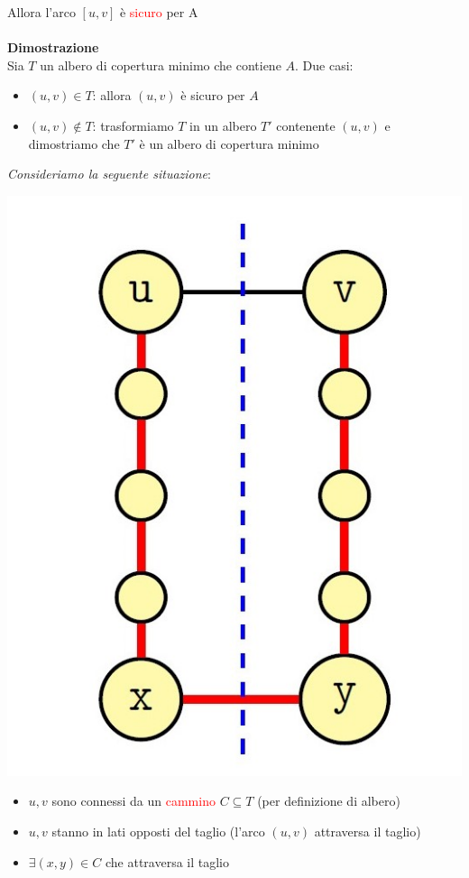 \documentclass[../cheatSheetAlgoritmi.tex]{subfiles}
\begin{document}
Allora l'arco $[u, v]$ è \textcolor{red}{sicuro} per A\\\\
\textbf{Dimostrazione}\\
Sia $T$ un albero di copertura minimo che contiene $A$. Due casi:
\begin{itemize}
	\item $(u, v) \in T$: allora $(u, v)$ è sicuro per $A$
	\item $(u, v) \notin T$: trasformiamo $T$ in un albero $T'$ contenente $(u, v)$ e dimostriamo che $T'$ è un albero di copertura minimo
\end{itemize}
\newpage
\begin{flushleft}
\emph{Consideriamo la seguente situazione}:
\end{flushleft}
\noindent\begin{minipage}{0.3\textwidth}
\includegraphics[width=\linewidth]{../img/Greedy_5.jpg}
\end{minipage}
\hfill
\begin{minipage}{0.6\textwidth}\raggedleft
\begin{itemize}
	\item $u, v$ sono connessi da un \textcolor{red}{cammino} $C \subseteq T$ (per definizione di albero)
	\item $u, v$ stanno in lati opposti del taglio (l'arco $(u, v)$ attraversa il taglio)
	\item $\exists (x, y) \in C$ che attraversa il taglio
\end{itemize}
\end{minipage}
\end{document}
